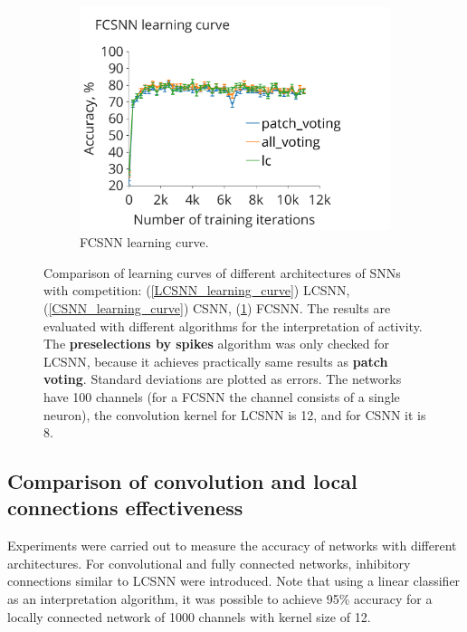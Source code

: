 \documentclass[a4paper]{article}
\begin{document}
\begin{figure}\ContinuedFloat
\begin{subfigure}{0.48\textwidth} 
    \includegraphics[width=\textwidth,keepaspectratio=true]{FCSNN_learning_rate.pdf}
 \caption{FCSNN learning curve.}
 \label{FCSNN_learning_curve}
\end{subfigure}
\caption{Comparison of learning curves of different architectures of SNNs with competition: (\ref{LCSNN_learning_curve}) LCSNN, (\ref{CSNN_learning_curve}) CSNN, (\ref{FCSNN_learning_curve}) FCSNN. The results are evaluated with different algorithms for the interpretation of activity. The \textbf{preselections by spikes} algorithm was only checked for LCSNN, because it achieves practically same results as \textbf{patch voting}. Standard deviations are plotted as errors. The networks have 100 channels (for a FCSNN the channel consists of a single neuron), the convolution kernel for LCSNN is 12, and for CSNN it is 8.}
\label{fig:learning_curves}
\end{figure}

\subsection{Comparison of convolution and local connections effectiveness}
Experiments were carried out to measure the accuracy of networks with different architectures. For convolutional and fully connected networks,  inhibitory connections similar to LCSNN were introduced. Note that using a linear classifier as an interpretation algorithm, it was possible to achieve 95\% accuracy for a locally connected network of 1000 channels with kernel size of 12.
\end{document}
